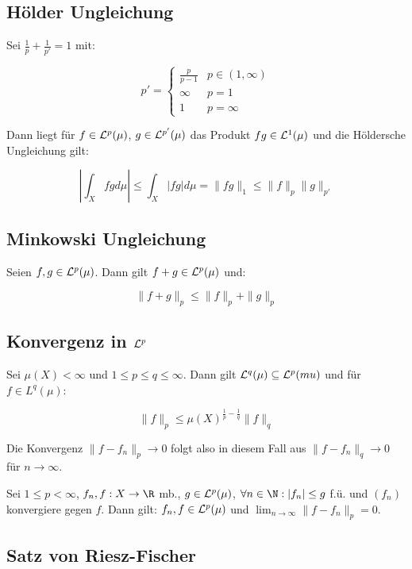 \subsection*{Hölder Ungleichung}

Sei $\frac{1}{p} + \frac{1}{p'} = 1$ mit:

\vspace{-4mm}
\[ p' = \begin{cases}
	\frac{p}{p-1} & p \in (1, \infty) \\
	\infty        & p = 1 \\
	1        & p = \infty
\end{cases} \]

Dann liegt für $f \in \mathcal{L}^p(\mu)$, $g \in \mathcal{L}^{p'}(\mu)$ das Produkt $fg \in \mathcal{L}^1(\mu)$ und die Höldersche Ungleichung gilt:

\vspace{-4mm}
\[ \left| \int_X fg d\mu \right| \leq \int_X |fg| d\mu = \|fg\|_1 \leq \|f\|_p \|g\|_{p'} \]

\subsection*{Minkowski Ungleichung}

Seien $f, g \in \mathcal{L}^p(\mu)$. Dann gilt $f + g \in \mathcal{L}^p(\mu)$ und:

\vspace{-2mm}
\[ \| f + g \|_p \leq \|f\|_p + \|g\|_p \]

\subsection*{Konvergenz in $\mathcal{L}^p$}

Sei $\mu(X) < \infty$ und $1 \leq p \leq q \leq \infty$. Dann gilt $\mathcal{L}^q(\mu) \subseteq \mathcal{L}^p(mu)$ und für $f \in L^q(\mu)$:

\vspace{-2mm}
\[ \|f\|_p \leq \mu(X)^{\frac{1}{p} - \frac{1}{q}} \|f\|_q \]

Die Konvergenz $\| f - f_n \|_p \to 0$ folgt also in diesem Fall aus $\| f - f_n \|_q \to 0$ für $n \to \infty$.

\spacing

Sei $1 \leq p < \infty$, $f_n, f : X \to \R$ mb., $g \in \mathcal{L}^p(\mu)$, $\forall n \in \N : |f_n| \leq g$ f.ü. und $(f_n)$ konvergiere gegen $f$. Dann gilt: $f_n, f \in \mathcal{L}^p(\mu)$ und $\lim_{n \to \infty} \|f - f_n\|_p = 0$.

\subsection*{Satz von Riesz-Fischer}


